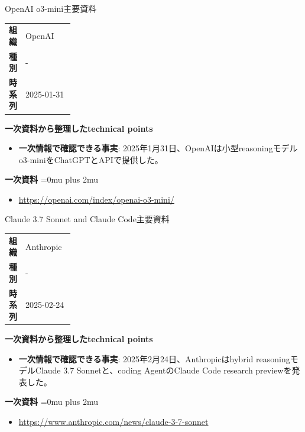 \begin{technicalnote}{OpenAI o3-mini}{主要資料}
\begingroup
\begin{tabularx}{\linewidth}{@{}>{\bfseries}p{0.22\linewidth}X@{}}
組織 & OpenAI \\
種別 & - \\
時系列 & 2025-01-31 \\
\end{tabularx}
\smallskip
{\bfseries 一次資料から整理したtechnical points}
\begin{itemize}[leftmargin=1.5em,itemsep=0.35em]
\item \textbf{一次情報で確認できる事実}: 2025年1月31日、OpenAIは小型reasoningモデルo3-miniをChatGPTとAPIで提供した。
\end{itemize}
\begin{samepage}
{\bfseries 一次資料}
\begingroup\sloppy
\Urlmuskip=0mu plus 2mu\relax
\begin{itemize}[leftmargin=1.5em,itemsep=0.25em]
\item {\scriptsize\url{https://openai.com/index/openai-o3-mini/}}
\end{itemize}
\endgroup
\end{samepage}
\endgroup
\end{technicalnote}
\medskip

\begin{technicalnote}{Claude 3.7 Sonnet and Claude Code}{主要資料}
\begingroup
\begin{tabularx}{\linewidth}{@{}>{\bfseries}p{0.22\linewidth}X@{}}
組織 & Anthropic \\
種別 & - \\
時系列 & 2025-02-24 \\
\end{tabularx}
\smallskip
{\bfseries 一次資料から整理したtechnical points}
\begin{itemize}[leftmargin=1.5em,itemsep=0.35em]
\item \textbf{一次情報で確認できる事実}: 2025年2月24日、Anthropicはhybrid reasoningモデルClaude 3.7 Sonnetと、coding AgentのClaude Code research previewを発表した。
\end{itemize}
\begin{samepage}
{\bfseries 一次資料}
\begingroup\sloppy
\Urlmuskip=0mu plus 2mu\relax
\begin{itemize}[leftmargin=1.5em,itemsep=0.25em]
\item {\scriptsize\url{https://www.anthropic.com/news/claude-3-7-sonnet}}
\end{itemize}
\endgroup
\end{samepage}
\endgroup
\end{technicalnote}
\medskip

